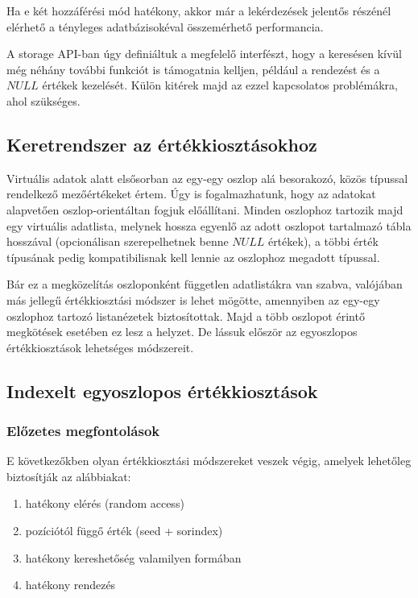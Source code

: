 \documentclass[
    parspace,
    noindent,
    nohyp,
]{elteiktdk}[2023/04/10]
\begin{document}
Ha e két hozzáférési mód hatékony, akkor már a lekérdezések jelentős részénél
elérhető a tényleges adatbázisokéval összemérhető performancia.

A storage API-ban úgy definiáltuk a megfelelő interfészt,
hogy a keresésen kívül még néhány további funkciót is támogatnia kelljen,
például a rendezést és a $NULL$ értékek kezelését.
Külön kitérek majd az ezzel kapcsolatos problémákra, ahol szükséges.

\subsection{Keretrendszer az értékkiosztásokhoz}

Virtuális adatok alatt elsősorban az egy-egy oszlop alá besorakozó,
közös típussal rendelkező mezőértékeket értem.
Úgy is fogalmazhatunk, hogy az adatokat alapvetően oszlop-orientáltan fogjuk előállítani.
Minden oszlophoz tartozik majd egy virtuális adatlista,
melynek hossza egyenlő az adott oszlopot tartalmazó tábla hosszával
(opcionálisan szerepelhetnek benne $NULL$ értékek),
a többi érték típusának pedig kompatibilisnak kell lennie az oszlophoz megadott típussal.

Bár ez a megközelítás oszloponként független adatlistákra van szabva,
valójában más jellegű értékkiosztási módszer is lehet mögötte,
amennyiben az egy-egy oszlophoz tartozó listanézetek biztosítottak.
Majd a több oszlopot érintő megkötések esetében ez lesz a helyzet.
De lássuk először az egyoszlopos értékkiosztások lehetséges módszereit.

\subsection{Indexelt egyoszlopos értékkiosztások}

\subsubsection{Előzetes megfontolások}

E következőkben olyan értékkiosztási módszereket veszek végig,
amelyek lehetőleg biztosítják az alábbiakat:

\begin{enumerate}
  \item hatékony elérés (random access)
  \item pozíciótól függő érték (seed + sorindex)
  \item hatékony kereshetőség valamilyen formában
  \item hatékony rendezés
\end{enumerate}
\end{document}
